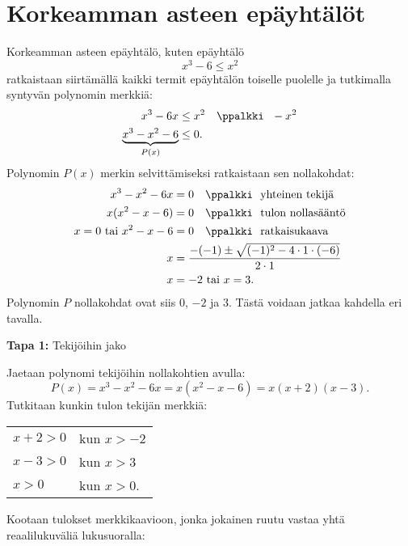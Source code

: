 \section{Korkeamman asteen epäyhtälöt}


Korkeamman asteen epäyhtälö, kuten epäyhtälö
$$x^3 -6 \leq x^2 $$
ratkaistaan siirtämällä kaikki termit epäyhtälön toiselle puolelle ja tutkimalla
syntyvän polynomin merkkiä:
\begin{align*}
x^3 -6x &\leq x^2 \quad \ppalkki \ \ -x^2 \\
\underbrace{x^3-x^2 -6}_{P(x)} &\leq 0.
\end{align*}
Polynomin $P(x)$ merkin selvittämiseksi ratkaistaan sen nollakohdat:
\begin{align*}
x^3 - x^2-6x &= 0 \quad \ppalkki \ \ \text{yhteinen tekijä} \\
x(x^2 -x -6) &= 0 \quad \ppalkki \ \ \text{tulon nollasääntö} \\
x = 0 \textrm{ tai } x^2 -x -6 &= 0 \quad\ppalkki \ \ \text{ratkaisukaava} \\
x &=\frac{-(-1) \pm \sqrt{(-1)^2-4\cdot 1 \cdot (-6)}}{2\cdot 1} \\
x &= -2 \textrm{ tai } x = 3.
\end{align*}
Polynomin $P$ nollakohdat ovat siis $0$, $-2$ ja $3$. Tästä voidaan jatkaa kahdella eri tavalla.

\textbf{Tapa 1:} Tekijöihin jako

Jaetaan polynomi tekijöihin nollakohtien avulla:
$$P(x) = x^3 - x^2-6x = x(x^2-x-6) = x(x+2)(x-3).$$
Tutkitaan kunkin tulon tekijän merkkiä:\\
\quad \begin{tabular}{ll}
$x+2>0$ & kun $x > -2$\\
$x-3>0$ & kun $x > 3$\\
$x>0$ & kun $x > 0$.
\end{tabular}

Kootaan tulokset merkkikaavioon, jonka jokainen ruutu vastaa
yhtä reaalilukuväliä lukusuoralla:

